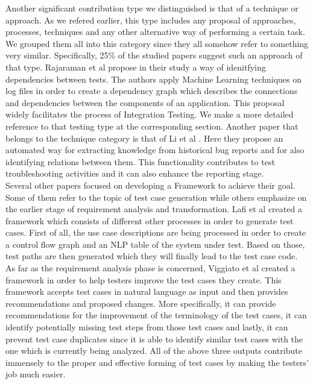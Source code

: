 Another significant contribution type we distinguished is that of a technique or approach. As we refered earlier, this type includes any proposal of approaches, processes, techniques and any 
other alternative way of performing a certain task. We grouped them all into this category since they all somehow refer to something very similar. Specifically, 25\% of the
studied papers suggest such an approach of that type. Rajaraman et al \cite{9197868} propose in their study a way of idenitfying dependencies between tests. The authors apply Machine Learning techniques 
on log files in order to create a dependency graph which describes the connections and dependencies between the components of an application. This proposal widely facilitates the process of Integration 
Testing. We make a more detailed reference to that testing type at the corresponding section. Another paper that belongs to the technique category is that of Li et al \cite{li2022towards}. Here they propose 
an automated way for extracting knowledge from historical bug reports and for also identifying relations between them. This functionality contributes to test troubleshooting activities and it can also enhance 
the reporting stage.\\

Several other papers focused on developing a Framework to achieve their goal. Some of them refer to the topic of test case generation while others 
emphasize on the earlier stage of requirement analysis and transformation. Lafi et al \cite{9491761} created a framework which consists of different other 
processes in order to generate test cases. First of all, the use case descriptions are being processed in order to create a control flow graph and an NLP table of the 
system under test. Based on those, test paths are then generated which they will finally lead to the test case code. As far as the requirement analysis phase 
is concerned, Viggiato et al \cite{viggiato2022using} created a framework in order to help testers improve the test cases they create. This framework 
accepts test cases in natural language as input and then provides recommendations and proposed changes. More specifically, it can provide recommendations 
for the improvement of the terminology of the test cases, it can identify potentially missing test steps from those test cases and lastly, it can 
prevent test case duplicates since it is able to identify similar test cases with the one which is currently being analyzed. All of the above three 
outputs contribute immensely to the proper and effective forming of test cases by making the testers' job much easier. \\


